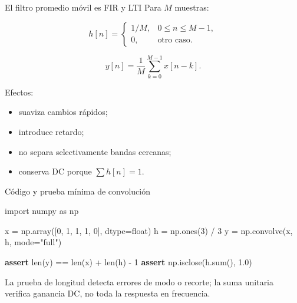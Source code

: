 \documentclass[
  ignorenonframetext,
  aspectratio=169,
  spanish,
  professionalfonts]{beamer}
\newenvironment{Shaded}{\begin{snugshade}}{\end{snugshade}}
\newcommand{\BuiltInTok}[1]{\textcolor[rgb]{0.00,0.23,0.31}{#1}}
\newcommand{\ControlFlowTok}[1]{\textcolor[rgb]{0.00,0.23,0.31}{\textbf{#1}}}
\newcommand{\DecValTok}[1]{\textcolor[rgb]{0.68,0.00,0.00}{#1}}
\newcommand{\FloatTok}[1]{\textcolor[rgb]{0.68,0.00,0.00}{#1}}
\newcommand{\ImportTok}[1]{\textcolor[rgb]{0.00,0.46,0.62}{#1}}
\newcommand{\NormalTok}[1]{\textcolor[rgb]{0.00,0.23,0.31}{#1}}
\newcommand{\OperatorTok}[1]{\textcolor[rgb]{0.37,0.37,0.37}{#1}}
\newcommand{\StringTok}[1]{\textcolor[rgb]{0.13,0.47,0.30}{#1}}
\providecommand{\tightlist}{%
  \setlength{\itemsep}{0pt}\setlength{\parskip}{0pt}}
\begin{document}
\begin{frame}{El filtro promedio móvil es FIR y LTI}
\protect{}\label{el-filtro-promedio-muxf3vil-es-fir-y-lti}
Para \(M\) muestras:

\[
h[n]=\begin{cases}
1/M, & 0\le n\le M-1,\\
0, & \text{otro caso}.
\end{cases}
\]

\[
y[n]=\frac{1}{M}\sum_{k=0}^{M-1}x[n-k].
\]

Efectos:

\begin{itemize}
\tightlist
\item
  suaviza cambios rápidos;
\item
  introduce retardo;
\item
  no separa selectivamente bandas cercanas;
\item
  conserva DC porque \(\sum h[n]=1\).
\end{itemize}
\end{frame}

\begin{frame}[fragile]{Código y prueba mínima de convolución}
\protect{}\label{cuxf3digo-y-prueba-muxednima-de-convoluciuxf3n}
\begin{Shaded}
\begin{Highlighting}[]
\ImportTok{import}\NormalTok{ numpy }\ImportTok{as}\NormalTok{ np}

\NormalTok{x }\OperatorTok{=}\NormalTok{ np.array([}\DecValTok{0}\NormalTok{, }\DecValTok{1}\NormalTok{, }\DecValTok{1}\NormalTok{, }\DecValTok{1}\NormalTok{, }\DecValTok{0}\NormalTok{], dtype}\OperatorTok{=}\BuiltInTok{float}\NormalTok{)}
\NormalTok{h }\OperatorTok{=}\NormalTok{ np.ones(}\DecValTok{3}\NormalTok{) }\OperatorTok{/} \DecValTok{3}
\NormalTok{y }\OperatorTok{=}\NormalTok{ np.convolve(x, h, mode}\OperatorTok{=}\StringTok{"full"}\NormalTok{)}

\ControlFlowTok{assert} \BuiltInTok{len}\NormalTok{(y) }\OperatorTok{==} \BuiltInTok{len}\NormalTok{(x) }\OperatorTok{+} \BuiltInTok{len}\NormalTok{(h) }\OperatorTok{{-}} \DecValTok{1}
\ControlFlowTok{assert}\NormalTok{ np.isclose(h.}\BuiltInTok{sum}\NormalTok{(), }\FloatTok{1.0}\NormalTok{)}
\end{Highlighting}
\end{Shaded}

\begin{tcolorbox}[enhanced jigsaw, arc=.35mm, bottomrule=.15mm, bottomtitle=1mm, breakable, colback=white, colbacktitle=quarto-callout-note-color!10!white, colframe=quarto-callout-note-color-frame, coltitle=black, left=2mm, leftrule=.75mm, opacityback=0, opacitybacktitle=0.6, rightrule=.15mm, title={Interpretación}, titlerule=0mm, toprule=.15mm, toptitle=1mm]

La prueba de longitud detecta errores de modo o recorte; la suma
unitaria verifica ganancia DC, no toda la respuesta en frecuencia.

\end{tcolorbox}
\end{frame}
\end{document}

